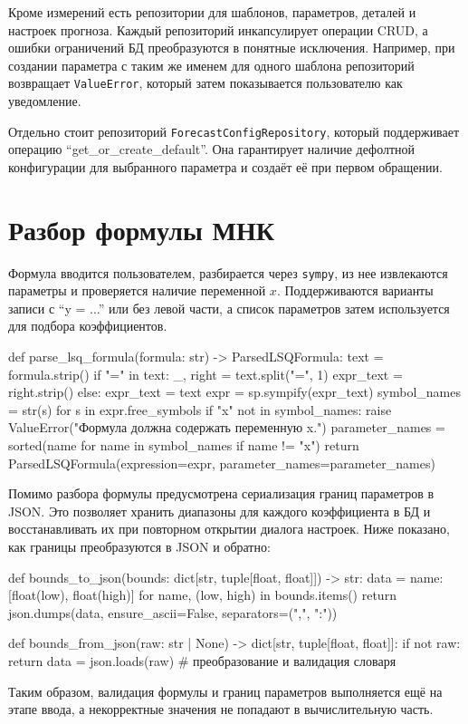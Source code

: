 \documentclass[12pt,a4paper]{article}
\begin{document}
Кроме измерений есть репозитории для шаблонов, параметров, деталей и настроек прогноза.
Каждый репозиторий инкапсулирует операции CRUD, а ошибки ограничений БД
преобразуются в понятные исключения. Например, при создании параметра
с таким же именем для одного шаблона репозиторий возвращает \texttt{ValueError},
который затем показывается пользователю как уведомление.

Отдельно стоит репозиторий \texttt{ForecastConfigRepository}, который поддерживает
операцию ``get\_or\_create\_default''. Она гарантирует наличие дефолтной конфигурации
для выбранного параметра и создаёт её при первом обращении.

\section*{Разбор формулы МНК}
Формула вводится пользователем, разбирается через \texttt{sympy}, из нее
извлекаются параметры и проверяется наличие переменной $x$.
Поддерживаются варианты записи с ``y = ...'' или без левой части, а список
параметров затем используется для подбора коэффициентов.
\begin{codeblock}
def parse_lsq_formula(formula: str) -> ParsedLSQFormula:
    text = formula.strip()
    if "=" in text:
        _, right = text.split("=", 1)
        expr_text = right.strip()
    else:
        expr_text = text
    expr = sp.sympify(expr_text)
    symbol_names = {str(s) for s in expr.free_symbols}
    if "x" not in symbol_names:
        raise ValueError("Формула должна содержать переменную x.")
    parameter_names = sorted(name for name in symbol_names if name != "x")
    return ParsedLSQFormula(expression=expr, parameter_names=parameter_names)
\end{codeblock}

Помимо разбора формулы предусмотрена сериализация границ параметров в JSON.
Это позволяет хранить диапазоны для каждого коэффициента в БД и восстанавливать их
при повторном открытии диалога настроек.
Ниже показано, как границы преобразуются в JSON и обратно:
\begin{codeblock}
def bounds_to_json(bounds: dict[str, tuple[float, float]]) -> str:
    data = {name: [float(low), float(high)] for name, (low, high) in bounds.items()}
    return json.dumps(data, ensure_ascii=False, separators=(",", ":"))

def bounds_from_json(raw: str | None) -> dict[str, tuple[float, float]]:
    if not raw:
        return {}
    data = json.loads(raw)
    # преобразование и валидация словаря
\end{codeblock}
Таким образом, валидация формулы и границ параметров выполняется ещё на этапе ввода,
а некорректные значения не попадают в вычислительную часть.
\end{document}
